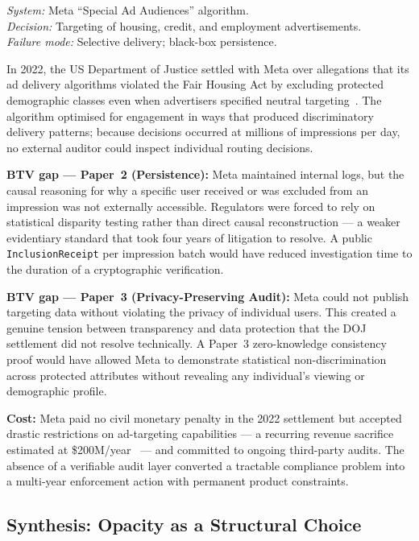 \noindent\textit{System:} Meta ``Special Ad Audiences'' algorithm.\\
\textit{Decision:} Targeting of housing, credit, and employment advertisements.\\
\textit{Failure mode:} Selective delivery; black-box persistence.

In 2022, the US Department of Justice settled with Meta over allegations
that its ad delivery algorithms violated the Fair Housing Act by
excluding protected demographic classes even when advertisers specified
neutral targeting~\cite{doj2022meta}. The algorithm optimised for
engagement in ways that produced discriminatory delivery patterns;
because decisions occurred at millions of impressions per day, no
external auditor could inspect individual routing decisions.

\textbf{BTV gap --- Paper~2 (Persistence):} Meta maintained internal
logs, but the causal reasoning for why a specific user received or was
excluded from an impression was not externally accessible. Regulators
were forced to rely on statistical disparity testing rather than direct
causal reconstruction --- a weaker evidentiary standard that took four
years of litigation to resolve. A public \texttt{InclusionReceipt} per
impression batch would have reduced investigation time to the duration
of a cryptographic verification.

\textbf{BTV gap --- Paper~3 (Privacy-Preserving Audit):} Meta could not
publish targeting data without violating the privacy of individual users.
This created a genuine tension between transparency and data protection
that the DOJ settlement did not resolve technically. A Paper~3
zero-knowledge consistency proof would have allowed Meta to demonstrate
statistical non-discrimination across protected attributes without
revealing any individual's viewing or demographic profile.

\textbf{Cost:} Meta paid no civil monetary penalty in the 2022
settlement but accepted drastic restrictions on ad-targeting capabilities
--- a recurring revenue sacrifice estimated at \$200M/year~\cite{meta-settlement-analysis} --- and committed to ongoing third-party audits.
The absence of a verifiable audit layer converted a tractable compliance
problem into a multi-year enforcement action with permanent product
constraints.

\subsection{Synthesis: Opacity as a Structural Choice}
\label{subsec:synthesis}

